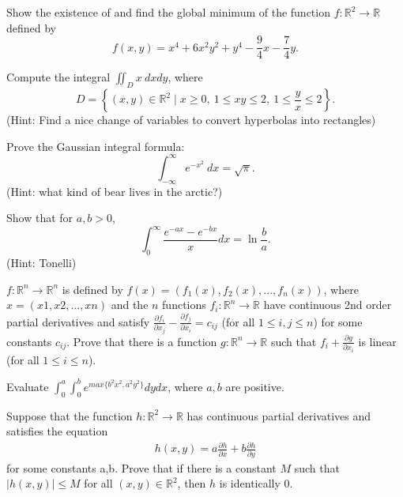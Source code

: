 \documentclass{article}
\begin{document}
\begin{exercise} 
    Show the existence of and find the global minimum of the function $f:\mathbb{R}^2\to\mathbb{R}$ defined by
    \[f(x,y) = x^4 + 6x^2y^2 + y^4 - \frac94x - \frac74 y.\]
\end{exercise}

\begin{exercise}
    Compute the integral $\iint_D x\ d\!xd\!y$, where
    \[D = \left\{(x,y)\in\mathbb R^2\mid x\geq 0,\ 1\leq xy\leq 2,\ 1\leq\frac yx\leq 2\right\}.\]
    (Hint: Find a nice change of variables to convert hyperbolas into rectangles)
\end{exercise}

\begin{exercise}
    Prove the Gaussian integral formula:
    \[\int_{-\infty}^\infty e^{-x^2}\ d\!x = \sqrt\pi.\]
    (Hint: what kind of bear lives in the arctic?)
\end{exercise}

\begin{exercise}
    Show that for $a,b>0$, 
    \[\int_0^\infty \frac{e^{-ax}-e^{-bx}}{x}d\!x = \ln\frac ba.\]
    (Hint: Tonelli)
\end{exercise}


\begin{exercise}[1986 A5]
    $f:\mathbb{R}^n \rightarrow \mathbb{R}^n$ is defined by $f(x) =(f_1(x), f_2(x), ... , f_n(x))$, where $x = (x1, x2, ... , xn)$ and the $n$ functions $f_i:\mathbb{R}^n\rightarrow \mathbb{R}$ have continuous 2nd order partial derivatives and satisfy $\frac{\partial f_i}{\partial x_j} - \frac{\partial f_j}{\partial x_i} = c_{ij}$ (for all $1 \leq i, j \leq n$) for some constants $c_{ij}$. Prove that there is a function $g:\mathbb{R}^n\rightarrow \mathbb{R}$ such that $f_i + \frac{\partial g}{\partial x_i}$ is linear (for all $1 \leq i \leq n$).


\end{exercise}


\begin{exercise}[1989 A2]
Evaluate $\int_{0}^{a} \int_{0}^{b} e^{max\{b^2x^2, a^2y^2\}}dydx$, where $a,b$ are positive.
\end{exercise}

\begin{exercise}[2010 A3]
    Suppose that the function $h: \mathbb{R}^2 \rightarrow \mathbb{R}$ has continuous partial derivatives and satisfies the equation 
    \begin{align*} 
        h(x,y) = a\frac{\partial h}{\partial x} + b\frac{\partial h}{\partial y}
    \end{align*}
    for some constants a,b. Prove that if there is a constant $M$ such that $|h(x,y)| \leq M$ for all $(x,y) \in \mathbb{R}^2$, then $h$ is identically 0.
\end{exercise}
\end{document}
